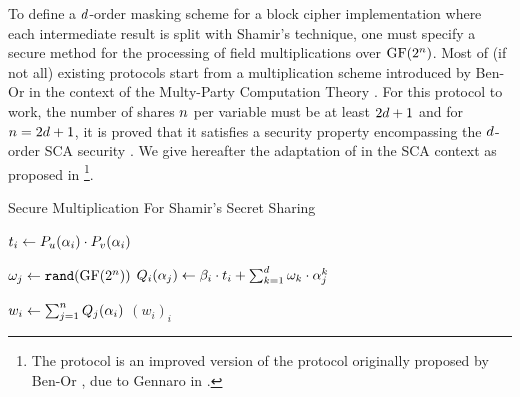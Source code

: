 \documentclass{llncs}
\begin{document}
To define a $\order$\myth-order masking scheme for a block cipher
implementation where each intermediate result is split with Shamir's
technique, one must specify a secure method for the processing of field
multiplications over $\GFn$. Most of (if not all) existing protocols start from a multiplication scheme introduced by
Ben-Or \etal in the context of the Multy-Party Computation Theory
\cite{BGW88}. For this protocol to work, the number of shares $\nbShares$ per variable must be at least $2\order+1$ and for $\nbShares=2\order+1$, it is proved that it satisfies a security property encompassing the $\order$\myth-order SCA security \cite{PR11}. We give hereafter the adaptation of
\cite{BGW88} in the 
SCA context as proposed in \cite{PR11,RP12}\footnote{The protocol is 
an improved version of the protocol originally proposed by Ben-Or \etal \cite{BGW88},
due to Gennaro \etal in \cite{GRR98}.}.


\begin{algorithm}
\caption{Secure Multiplication For Shamir's Secret Sharing}
\label{alg:secmult}
\begin{algorithmic}[1]


\State $t_i \leftarrow P_u(\pubElt)\cdot P_{v}(\pubElt)$
\EndFor

\State $\omega_j \leftarrow \texttt{rand}(\GFn)$
\EndFor
{}
\State $Q_i(\pubElt[j]) \leftarrow \beta_i \cdot t_i +
      \sum_{k=1}^{\order} \omega_k\cdot \pubElt[j]^k$ \label{step:reshare}   	
\EndFor  	
\EndFor
   	
\State $w_i \leftarrow \sum_{j=1}^{\nbShares} Q_j(\pubElt)$
\EndFor
\Return $(w_i)_i$
\end{algorithmic}
\end{algorithm}
\end{document}
